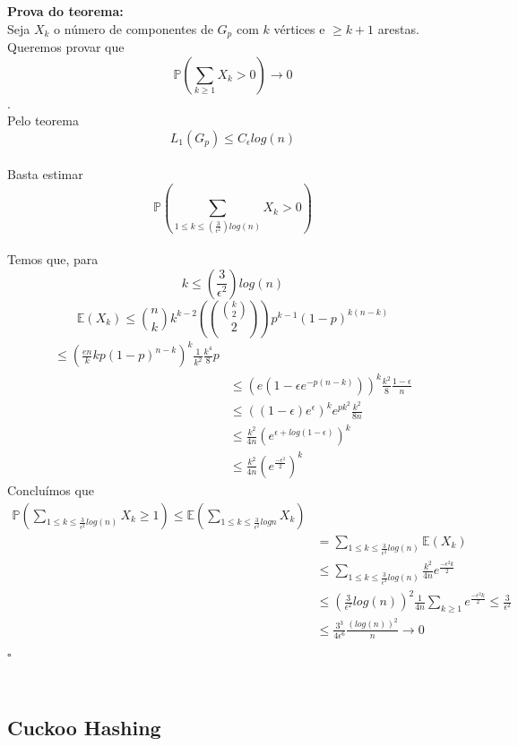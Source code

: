 \textbf{Prova do teorema:}\\

Seja $X_{k}$ o número de componentes de $G_{p}$ com $k$ vértices e $\geq k+1$ arestas.\\
Queremos provar que \[\mathbb{P}(\sum_{k\geq 1} X_{k}>0) \rightarrow 0\].\\
Pelo teorema \[L_{1}(G_{p}) \leq C_{\epsilon}log(n)\]\\
Basta estimar \[\mathbb{P}(\sum_{1\leq k \leq(\frac{3}{\epsilon^2})log(n)} X_{k} > 0)\]\\
Temos que, para \[k \leq(\frac{3}{\epsilon^2})log(n)\]
\[\mathbb{E}(X_{k})\leq {n\choose k}k^{k-2}({{k\choose 2}\choose 2})p^{k-1} (1-p)^{k(n-k)}\]
\begin{align*}
	  \leq  (\frac{en}{k}kp(1-p)^{n-k})^{k}\frac{1}{k^{2}}\frac{k^{4}}{8}p \\
	  &\leq (e(1-\epsilon e^{-p(n-k)}))^{k}\frac{k^2}{8}\frac{1-\epsilon}{n} \\
	  &\leq ((1-\epsilon)e^{\epsilon})^{k}e^{pk^{2}}\frac{k^2}{8n} \\
	  &\leq \frac{k^{2}}{4n}(e^{\epsilon+log(1-\epsilon)})^{k} \\
	  &\leq \frac{k^{2}}{4n}(e^{\frac{-\epsilon^{2}}{2}})^{k}
\end{align*}
Concluímos que
\begin{align*}
	\mathbb{P}(\sum_{1\leq k \leq \frac{3}{\epsilon^{2}}log(n)}X_{k}\geq 1) \leq \mathbb{E}(\sum_{1\leq k \leq \frac{3}{\epsilon^{2}}log n}X_{k}) \\
	&= \sum_{1\leq k \leq \frac{3}{\epsilon^{2}}log(n)} \mathbb{E}(X_{k}) \\
	&\leq \sum_{1\leq k \leq \frac{3}{\epsilon^{2}}log(n)}\frac{k^{2}}{4n} e^{\frac{-\epsilon^{2}k}{2}} \\
	&\leq (\frac{3}{\epsilon^{2}}log(n))^{2}\frac{1}{4n}\sum_{k \geq 1} e^{\frac{-\epsilon^2 k}{2}} \leq \frac{3}{\epsilon^{2}} \\
	&\leq \frac{3^{3}}{4\epsilon^{6}}\frac{(log(n))^{2}}{n} \rightarrow 0
\end{align*}

\begin{flushright}
$\square$
\end{flushright}\\

\subsection{Cuckoo Hashing}\\

